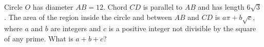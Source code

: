 Circle $O$ has diameter $AB=12$. Chord $CD$ is parallel to $AB$ and has length $6\sqrt3$. The area of the region inside the circle and between $AB$ and $CD$ is $a\pi+b\sqrt c$, where $a$ and $b$ are integers and $c$ is a positive integer not divisible by the square of any prime. What is $a+b+c$?
